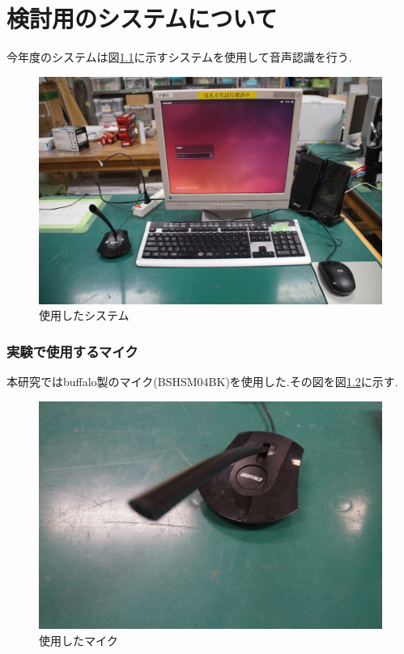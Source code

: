\documentclass[12pt,oneside]{sotsuken_paper}
\begin{document}
\chapter{検討用のシステムについて}
今年度のシステムは図\ref{fig:robot}に示すシステムを使用して音声認識を行う.


\begin{figure}[htbp]
\begin{center}
\includegraphics[width=120mm]{img/robo.JPG}
\caption{使用したシステム}
\label{fig:robot}
\end{center}
\end{figure}


\subsection{実験で使用するマイク}
本研究ではbuffalo製のマイク(BSHSM04BK)を使用した.その図を図\ref{fig:mic}に示す.


\begin{figure}[htbp]
\begin{center}
\includegraphics[width=120mm]{img/mic.JPG}
\caption{使用したマイク}
\label{fig:mic}
\end{center}
\end{figure}
\end{document}
